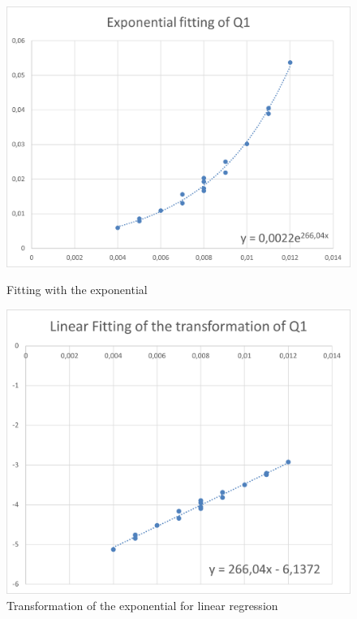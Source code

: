 \documentclass{article}
\begin{document}
                    \begin{figure}[htbp!]
                        \centering
                        \begin{minipage}[c]{.40\textwidth}
                            \centering
                            \includegraphics[width=\textwidth]{./data_analysis/Q1_exp_delta_mu.png}
                            \caption{Fitting with the exponential}
                            \label{fig:Q1_exp_delta_mu}
                        \end{minipage}
                        \hspace{10mm}
                        \begin{minipage}[c]{.40\textwidth}
                            \centering
                            \includegraphics[width=\textwidth]{./data_analysis/Q1_lin_delta_mu.png}
                            \caption{Transformation of the exponential for linear regression}
                            \label{fig:Q1_lin_delta_mu}
                        \end{minipage}
                    \end{figure}
                    
\end{document}
